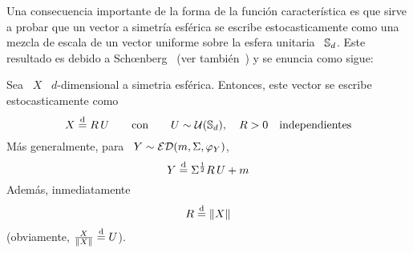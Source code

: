 Una consecuencia importante de la  forma de la funci\'on caracter\'istica es que
sirve a probar  que un vector a simetr\'ia  esf\'erica se escribe estocasticamente
como  una mezcla de  escala de  un vector  uniforme sobre  la esfera  unitaria \
$\mathbb{S}_d$. Este resultado es  debido a Sch{\oe}nberg~\cite{Sch38, FanKot90} (ver
tambi\'en~\cite{KeiSte74, Tei60}) y se enuncia como sigue:
%
\begin{teorema}\label{Teo:MP:MezclaUniforme}
  Sea  \ $X$ \  $d$-dimensional a  simetria esf\'erica.  Entonces, este  vector se
  escribe estocasticamente como
  \[
  X \stackrel{\mathrm{d}}{=} R \, U \qquad \mbox{con} \qquad U \sim \mathcal{U}(\mathbb{S}_d), \quad R > 0 \quad
  \mbox{independientes}
  \]
  M\'as generalmente, para \ $Y \sim \mathcal{ED}(m,\Sigma,\varphi_Y)$,
  \[
  Y \stackrel{\mathrm{d}}{=} \Sigma^{\frac12} R \, U + m
  \]
  Adem\'as, inmediatamente
  \[
  R \stackrel{\mathrm{d}}{=} \| X \|
  \]
  (obviamente, $\frac{X}{\| X \|} \stackrel{\mathrm{d}}{=} U$).
\end{teorema}
%
